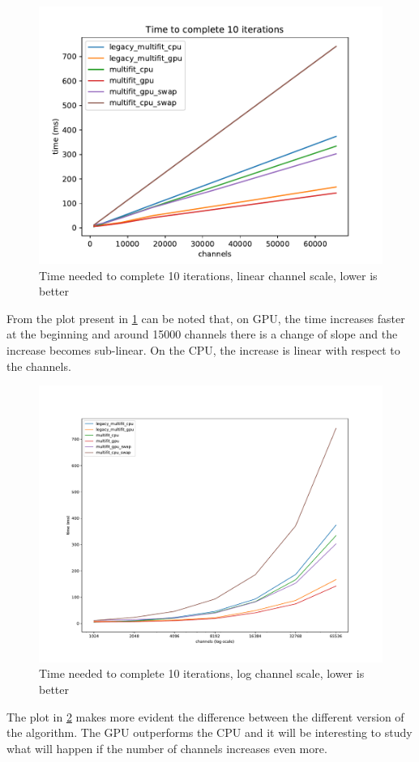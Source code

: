 \begin{figure}[h]
  \includegraphics[width=.75\textwidth]{img/linscale}
  \caption{Time needed to complete 10 iterations, linear channel scale, lower is better}
  \label{img:linscale01}
\end{figure}
From the plot present in \ref{img:linscale01} can be noted that, on GPU, the time increases faster at the beginning and around 15000 channels there is a change of slope and the increase becomes sub-linear. On the CPU, the increase is linear with respect to the channels.
\begin{figure}[h]
  \includegraphics[width=.75\textwidth]{img/logscale}
  \caption{Time needed to complete 10 iterations, log channel scale, lower is better}
  \label{img:logscale01}
\end{figure}
The plot in \ref{img:logscale01} makes more evident the difference between the different version of the algorithm. The GPU outperforms the CPU and it will be interesting to study what will happen if the number of channels increases even more.\\

